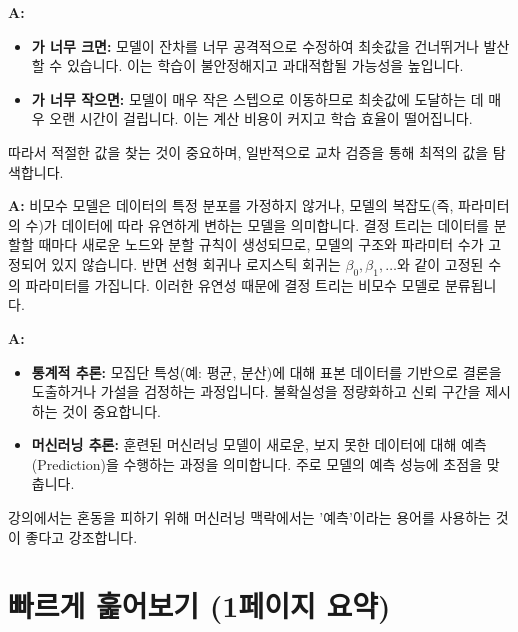 \documentclass[11pt,a4paper]{book}
\theoremstyle{definition}
\begin{document}
\begin{faqbox}[title=\textbf{Q: 학습률(\texttt{\lambda})이 너무 크거나 작으면 모델 학습에 어떤 문제가 발생하나요?}] %
\textbf{A:}
\begin{itemize}
    \item \textbf{\texttt{\lambda}가 너무 크면:} 모델이 잔차를 너무 공격적으로 수정하여 최솟값을 건너뛰거나 발산할 수 있습니다. 이는 학습이 불안정해지고 과대적합될 가능성을 높입니다.
    \item \textbf{\texttt{\lambda}가 너무 작으면:} 모델이 매우 작은 스텝으로 이동하므로 최솟값에 도달하는 데 매우 오랜 시간이 걸립니다. 이는 계산 비용이 커지고 학습 효율이 떨어집니다.
\end{itemize}
따라서 적절한 \texttt{\lambda} 값을 찾는 것이 중요하며, 일반적으로 교차 검증을 통해 최적의 값을 탐색합니다.
\end{faqbox}

\begin{faqbox}[title=\textbf{Q: 결정 트리가 왜 비모수 모델(Non-parametric Model)인가요?}] %
\textbf{A:} 비모수 모델은 데이터의 특정 분포를 가정하지 않거나, 모델의 복잡도(즉, 파라미터의 수)가 데이터에 따라 유연하게 변하는 모델을 의미합니다. 결정 트리는 데이터를 분할할 때마다 새로운 노드와 분할 규칙이 생성되므로, 모델의 구조와 파라미터 수가 고정되어 있지 않습니다. 반면 선형 회귀나 로지스틱 회귀는 $\beta_0, \beta_1, \dots$와 같이 고정된 수의 파라미터를 가집니다. 이러한 유연성 때문에 결정 트리는 비모수 모델로 분류됩니다.
\end{faqbox}

\begin{faqbox}[title=\textbf{Q: 머신러닝에서 '추론(Inference)'이라는 용어는 통계적 추론과 어떻게 다른가요?}] %
\textbf{A:}
\begin{itemize}
    \item \textbf{통계적 추론:} 모집단 특성(예: 평균, 분산)에 대해 표본 데이터를 기반으로 결론을 도출하거나 가설을 검정하는 과정입니다. 불확실성을 정량화하고 신뢰 구간을 제시하는 것이 중요합니다.
    \item \textbf{머신러닝 추론:} 훈련된 머신러닝 모델이 새로운, 보지 못한 데이터에 대해 예측(Prediction)을 수행하는 과정을 의미합니다. 주로 모델의 예측 성능에 초점을 맞춥니다.
\end{itemize}
강의에서는 혼동을 피하기 위해 머신러닝 맥락에서는 '예측'이라는 용어를 사용하는 것이 좋다고 강조합니다.
\end{faqbox}


\section{빠르게 훑어보기 (1페이지 요약)}
\end{document}
